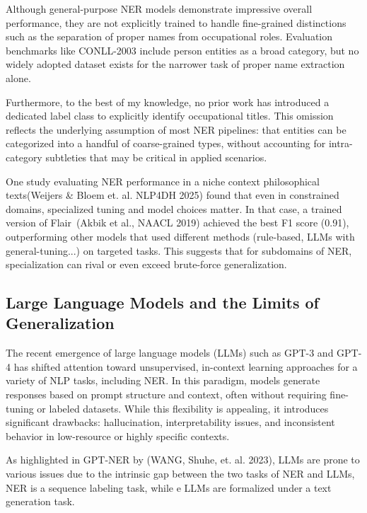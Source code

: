 \documentclass[a4paper]{usiinfbachelorproject}
\begin{document}
Although general-purpose NER models demonstrate impressive overall performance, they are not explicitly trained to handle fine-grained distinctions such as the separation of proper names from occupational roles. Evaluation benchmarks like CONLL-2003 include person entities as a broad category, but no widely adopted dataset exists for the narrower task of proper name extraction alone.

Furthermore, to the best of my knowledge, no prior work has introduced a dedicated label class to explicitly identify occupational titles. This omission reflects the underlying assumption of most NER pipelines: that entities can be categorized into a handful of coarse-grained types, without accounting for intra-category subtleties that may be critical in applied scenarios.

One study evaluating NER performance in a niche context philosophical texts\cite{weijers2025evaluation}(Weijers \& Bloem et. al. NLP4DH 2025) found that even in constrained domains, specialized tuning and model choices matter. In that case, a trained version of Flair~\cite{akbik-etal-2019-flair}(Akbik et al., NAACL 2019) achieved the best F1 score (0.91), outperforming other models that used different methods (rule-based, LLMs with general-tuning...) on targeted tasks. This suggests that for subdomains of NER, specialization can rival or even exceed brute-force generalization.

\subsection{Large Language Models and the Limits of Generalization}

The recent emergence of large language models (LLMs) such as GPT-3 and GPT-4 has shifted attention toward unsupervised, in-context learning approaches for a variety of NLP tasks, including NER. In this paradigm, models generate responses based on prompt structure and context, often without requiring fine-tuning or labeled datasets. While this flexibility is appealing, it introduces significant drawbacks: hallucination, interpretability issues, and inconsistent behavior in low-resource or highly specific contexts.

As highlighted in GPT-NER by \cite{DBLP:journals/corr/abs-2304-10428}(WANG, Shuhe, et. al. 2023), LLMs are prone to various issues due to the intrinsic gap between the two tasks of NER and LLMs, NER is a sequence labeling task, while e LLMs are formalized under a text generation task.
\end{document}
